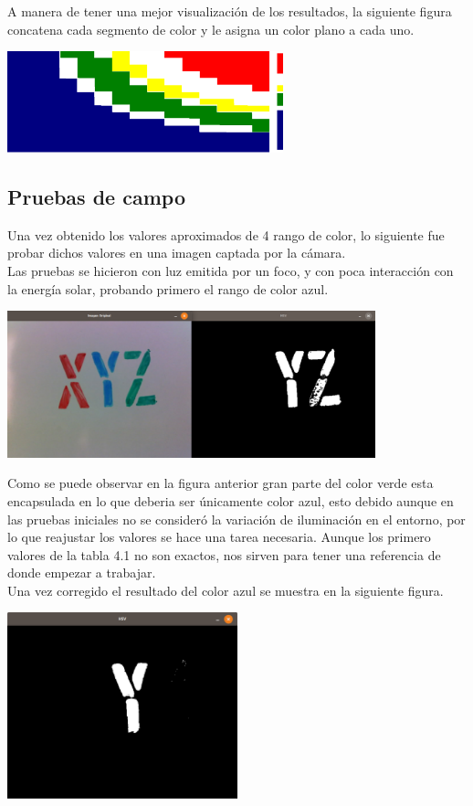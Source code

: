 A manera de tener una mejor visualización de los resultados, la siguiente figura concatena
cada segmento de color y le asigna un color plano a cada uno.
\begin{center}
	\includegraphics[width=0.6\textwidth]{Contenido/Cuerpo/Capitulo4/Fig6.eps}
	\label{Fig6}
\end{center}

\subsection{Pruebas de campo}
Una vez obtenido los valores aproximados de 4 rango de color, lo siguiente fue probar
dichos valores en una imagen captada por la cámara.\\
Las pruebas se hicieron con luz emitida por un foco, y con poca interacción con la
energía solar, probando primero el rango de color azul.
\begin{center}
	\includegraphics[width=0.8\textwidth]{Contenido/Cuerpo/Capitulo4/Fig7.eps}
	\label{Fig7}
\end{center}
Como se puede observar en la figura anterior gran parte del color verde esta encapsulada
en lo que deberia ser únicamente color azul, esto debido aunque en las pruebas iniciales
no se consideró la variación de iluminación en el entorno, por lo que reajustar los
valores se hace una tarea necesaria. Aunque los primero valores de la tabla 4.1
no son exactos, nos sirven para tener una referencia de donde empezar a trabajar.\\
Una vez corregido el resultado del color azul se muestra en la siguiente figura.
\begin{center}
	\includegraphics[width=0.5\textwidth]{Contenido/Cuerpo/Capitulo4/Fig9.eps}
	\label{Fig8}
\end{center}
